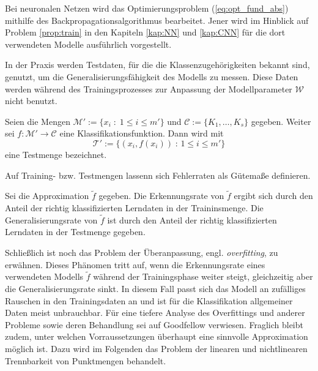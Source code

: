 Bei neuronalen Netzen wird das Optimierungsproblem (\ref{eq:opt_fund_abs}) mithilfe des Backpropagationsalgorithmus bearbeitet. Jener wird im Hinblick auf Problem \ref{prop:train} in den Kapiteln \ref{kap:NN} und \ref{kap:CNN} für die dort verwendeten Modelle ausführlich vorgestellt. 

In der Praxis werden Testdaten, für die die Klassenzugehörigkeiten bekannt sind, genutzt, um die Generalisierungsfähigkeit des Modells zu messen. Diese Daten werden während des Trainingsprozesses zur Anpassung der Modellparameter $\mathcal{W}$ nicht benutzt.

\begin{defi}[Testmenge]
    Seien die Mengen $\mathcal{M}':=\{x_i \; : \; 1 \leq i \leq m'\}$ und $\mathcal{C}:=\{K_1, \ldots, K_s \}$ gegeben. Weiter sei $f: \mathcal{M}' \rightarrow \mathcal{C}$ eine Klassifikationsfunktion. Dann wird mit 
    \begin{equation}
        \label{eq:testset}
        \mathcal{T}':=\{(x_i, f(x_i))\; : \, 1 \leq i \leq m'\}
    \end{equation}
    eine Testmenge bezeichnet.
\end{defi}
Auf Training- bzw. Testmengen lassenn sich Fehlerraten als Gütemaße definieren.

\begin{defi}
    Sei die Approximation $\tilde{f}$ gegeben.
    Die Erkennungsrate von $\tilde{f}$ ergibt sich durch den Anteil der richtig klassifizierten Lerndaten in der Traininsmenge. Die Generalisierungsrate von $\tilde{f}$ ist durch den Anteil der richtig klassifizierten Lerndaten in der Testmenge gegeben.
\end{defi}

Schließlich ist noch das Problem der Überanpassung, engl. \textit{overfitting}, zu erwähnen. Dieses Phänomen tritt auf, wenn die Erkennungsrate eines verwendeten Modells $\tilde{f}$ während der Trainingsphase weiter steigt, gleichzeitig aber die Generalisierungsrate sinkt. In diesem Fall passt sich das Modell an zufälliges Rauschen in den Trainingsdaten an und ist für die Klassifikation allgemeiner Daten meist unbrauchbar. Für eine tiefere Analyse des Overfittings und anderer Probleme sowie deren Behandlung sei auf Goodfellow\cite{Goodfellow-et-al-2016} verwiesen.
Fraglich bleibt zudem, unter welchen Vorraussetzungen überhaupt eine sinnvolle Approximation möglich ist. Dazu wird im Folgenden das Problem der linearen und nichtlinearen Trennbarkeit von Punktmengen behandelt.
